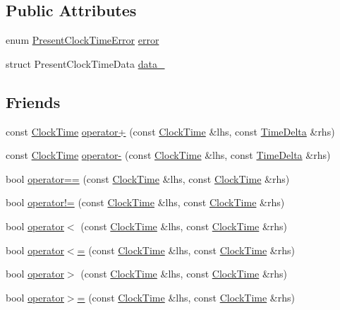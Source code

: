 \subsection*{\-Public \-Attributes}
\begin{DoxyCompactItemize}
\item 
enum \hyperlink{clock-time_8h_a40f97cceae12156ea6da9bd1c170d455}{\-Present\-Clock\-Time\-Error} \hyperlink{structClockTime_a58f5305f36468eee0d1c489b5d72d717}{error}
\item 
struct \-Present\-Clock\-Time\-Data \hyperlink{structClockTime_a3fe115dffef3ba153e1fff6e0b2c0a23}{data\-\_\-}
\end{DoxyCompactItemize}
\subsection*{\-Friends}
\begin{DoxyCompactItemize}
\item 
const \hyperlink{structClockTime}{\-Clock\-Time} \hyperlink{structClockTime_afceb2935d4b931a097145e4967ac71b6}{operator+} (const \hyperlink{structClockTime}{\-Clock\-Time} \&lhs, const \hyperlink{structTimeDelta}{\-Time\-Delta} \&rhs)
\item 
const \hyperlink{structClockTime}{\-Clock\-Time} \hyperlink{structClockTime_a21ba0831914be0b997460299bf287cf3}{operator-\/} (const \hyperlink{structClockTime}{\-Clock\-Time} \&lhs, const \hyperlink{structTimeDelta}{\-Time\-Delta} \&rhs)
\item 
bool \hyperlink{structClockTime_a69e5484eac6807a928f087cfa84637df}{operator==} (const \hyperlink{structClockTime}{\-Clock\-Time} \&lhs, const \hyperlink{structClockTime}{\-Clock\-Time} \&rhs)
\item 
bool \hyperlink{structClockTime_a9a90069d85b56c30d69ab78e949c3911}{operator!=} (const \hyperlink{structClockTime}{\-Clock\-Time} \&lhs, const \hyperlink{structClockTime}{\-Clock\-Time} \&rhs)
\item 
bool \hyperlink{structClockTime_a1559fb2a3b03d37e75624999c9da2bc8}{operator$<$} (const \hyperlink{structClockTime}{\-Clock\-Time} \&lhs, const \hyperlink{structClockTime}{\-Clock\-Time} \&rhs)
\item 
bool \hyperlink{structClockTime_ae86e4ffa336f7ef101ab39631a143c19}{operator$<$=} (const \hyperlink{structClockTime}{\-Clock\-Time} \&lhs, const \hyperlink{structClockTime}{\-Clock\-Time} \&rhs)
\item 
bool \hyperlink{structClockTime_af8b6940e326db070a338d4adb7d54bd9}{operator$>$} (const \hyperlink{structClockTime}{\-Clock\-Time} \&lhs, const \hyperlink{structClockTime}{\-Clock\-Time} \&rhs)
\item 
bool \hyperlink{structClockTime_af2d17dcdd53d7cb57311cebe530be868}{operator$>$=} (const \hyperlink{structClockTime}{\-Clock\-Time} \&lhs, const \hyperlink{structClockTime}{\-Clock\-Time} \&rhs)
\end{DoxyCompactItemize}


